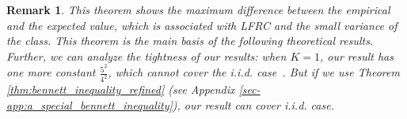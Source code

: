 \documentclass{article}
\def\vx{{\mathbf{x}}}
\def\eE{\mathbb{E}}
\newtheorem*{remark}{Remark}
\begin{document}
\begin{remark}
    This theorem shows the maximum difference between the empirical and the expected value, which is associated with LFRC and the small variance of the class. 
    This theorem is the main basis of the following theoretical results. 
    Further, we can analyze the tightness of our results: when $K = 1$, our result has one more constant $\frac{5^2}{4^2}$, which cannot cover the i.i.d. case~\cite{Bartlett_2005}. But if we use Theorem \ref{thm:bennett_inequality_refined} (see Appendix \ref{sec-app:a_special_bennett_inequality}), our result can cover i.i.d. case. 
\end{remark}

 
 
\end{document}
